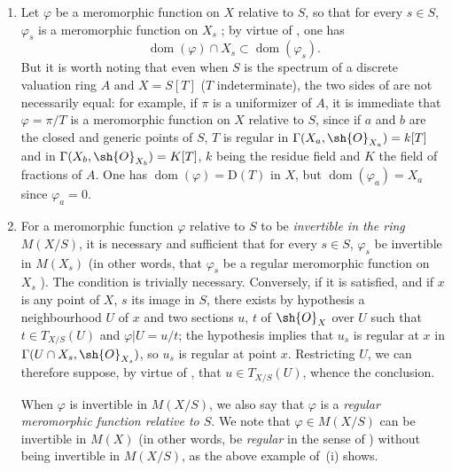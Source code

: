\begin{remarks}[20.6.5]
\label{IV.20.6.5}
\begin{enumerate}[label=(\roman*)]
  \item Let $\varphi$ be a meromorphic function on $X$ relative to $S$, so that for every $s\in S$, $\varphi_s$ is a meromorphic function on $X_s$ ;
  by virtue of , one has
  \[
  \label{IV.20.6.5.1}
    \operatorname{dom}(\varphi)\cap X_s\subset\operatorname{dom}(\varphi_s).
    \tag{20.6.5.1}
  \]
  But it is worth noting that even when $S$ is the spectrum of a discrete valuation ring $A$ and $X=S[T]$ ($T$ indeterminate), the two sides of  are not necessarily equal:
  for example, if $\pi$ is a uniformizer of $A$, it is immediate that $\varphi=\pi/T$ is a meromorphic function on $X$ relative to $S$, since if $a$ and $b$ are the closed and generic points of $S$, $T$ is regular in $\Gamma(X_a,\sh{O}_{X_a})=k[T]$ and in $\Gamma(X_b,\sh{O}_{X_b})=K[T]$, $k$ being the residue field and $K$ the field of fractions of $A$.
  One has $\operatorname{dom}(\varphi)=\mathrm{D}(T)$ in $X$, but $\operatorname{dom}(\varphi_a)=X_a$ since $\varphi_a=0$.

  \item{} For a meromorphic function $\varphi$ relative to $S$ to be \emph{invertible in the ring} $M(X/S)$, it is necessary and sufficient that for every $s\in S$, $\varphi_s$ be invertible in $M(X_s)$ (in other words, that $\varphi_s$ be a regular meromorphic function on $X_s$ ).
  The condition is trivially necessary.
  Conversely, if it is satisfied, and if $x$ is any point of $X$, $s$ its image in $S$, there exists by hypothesis a neighbourhood $U$ of $x$ and two sections $u$, $t$ of $\sh{O}_X$ over $U$ such that $t\in T_{X/S}(U)$ and $\varphi|U=u/t$;
  the hypothesis implies that $u_s$ is regular at $x$ in $\Gamma(U\cap X_s,\sh{O}_{X_s})$, so $u_s$ is regular at point $x$.
  Restricting $U$, we can therefore suppose, by virtue of , that $u\in T_{X/S}(U)$, whence the conclusion.

  When $\varphi$ is invertible in $M(X/S)$, we also say that $\varphi$ is a \emph{regular meromorphic function relative to $S$}.
  We note that $\varphi\in M(X/S)$ can be invertible in $M(X)$ (in other words, be \emph{regular} in the sense of ) without being invertible in $M(X/S)$, as the above example of~(i) shows.


\end{enumerate}
\end{remarks}
